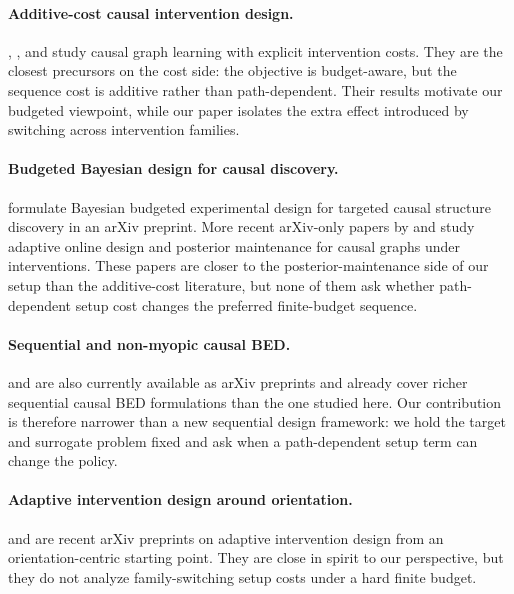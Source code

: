 \documentclass[10pt]{article}
\begin{document}
\paragraph{Additive-cost causal intervention design.}
\citet{kocaoglu2017cost}, \citet{ghassami2018budgeted}, and \citet{lindgren2018experimental} study causal graph learning with explicit intervention costs. They are the closest precursors on the cost side: the objective is budget-aware, but the sequence cost is additive rather than path-dependent. Their results motivate our budgeted viewpoint, while our paper isolates the extra effect introduced by switching across intervention families.

\paragraph{Budgeted Bayesian design for causal discovery.}
\citet{agrawal2019abcdstrategy} formulate Bayesian budgeted experimental design for targeted causal structure discovery in an arXiv preprint. More recent arXiv-only papers by \citet{elahi2024adaptive} and \citet{zhou2024sample} study adaptive online design and posterior maintenance for causal graphs under interventions. These papers are closer to the posterior-maintenance side of our setup than the additive-cost literature, but none of them ask whether path-dependent setup cost changes the preferred finite-budget sequence.

\paragraph{Sequential and non-myopic causal BED.}
\citet{annadani2023differentiable} and \citet{zhang2025goaloriented} are also currently available as arXiv preprints and already cover richer sequential causal BED formulations than the one studied here. Our contribution is therefore narrower than a new sequential design framework: we hold the target and surrogate problem fixed and ask when a path-dependent setup term can change the policy.

\paragraph{Adaptive intervention design around orientation.}
\citet{zhang2022active} and \citet{elrefaey2025from} are recent arXiv preprints on adaptive intervention design from an orientation-centric starting point. They are close in spirit to our perspective, but they do not analyze family-switching setup costs under a hard finite budget.
\end{document}
